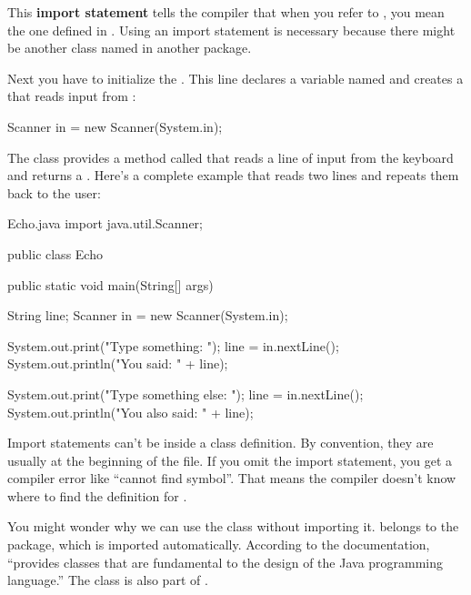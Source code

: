 
This {\bf import statement} tells the compiler that when you refer to , you mean the one defined in .
Using an import statement is necessary because there might be another class named  in another package.

Next you have to initialize the .
This line declares a  variable named  and creates a  that reads input from :


\begin{code}
Scanner in = new Scanner(System.in);
\end{code}

The  class provides a method called  that reads a line of input from the keyboard and returns a .
Here's a complete example that reads two lines and repeats them back to the user:


\begin{trinket}{Echo.java}
import java.util.Scanner;

public class Echo {

    public static void main(String[] args) {
        String line;
        Scanner in = new Scanner(System.in);

        System.out.print("Type something: ");
        line = in.nextLine();
        System.out.println("You said: " + line);

        System.out.print("Type something else: ");
        line = in.nextLine();
        System.out.println("You also said: " + line);
    }
}
\end{trinket}

Import statements can't be inside a class definition.
By convention, they are usually at the beginning of the file.
If you omit the import statement, you get a compiler error like ``cannot find symbol''.
That means the compiler doesn't know where to find the definition for .


You might wonder why we can use the  class without importing it.
 belongs to the  package, which is imported automatically.
According to the documentation,  ``provides classes that are fundamental to the design of the Java programming language.''
The  class is also part of .


